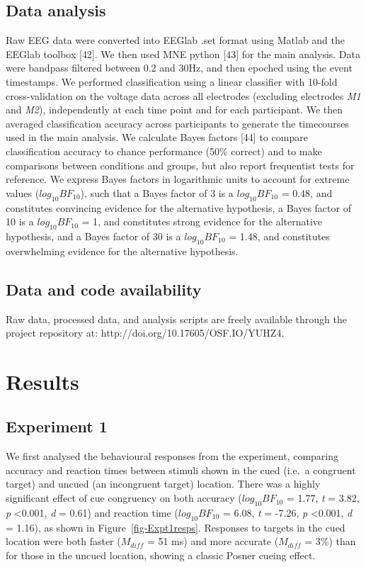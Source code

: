 \documentclass[
  letterpaper,
  DIV=11,
  numbers=noendperiod]{scrartcl}
\begin{document}
\subsection{Data analysis}\label{data-analysis}

Raw EEG data were converted into EEGlab .set format using Matlab and the
EEGlab toolbox {[}42{]}. We then used MNE python {[}43{]} for the main
analysis. Data were bandpass filtered between 0.2 and 30Hz, and then
epoched using the event timestamps. We performed classification using a
linear classifier with 10-fold cross-validation on the voltage data
across all electrodes (excluding electrodes \emph{M1} and \emph{M2}),
independently at each time point and for each participant. We then
averaged classification accuracy across participants to generate the
timecourses used in the main analysis. We calculate Bayes factors
{[}44{]} to compare classification accuracy to chance performance (50\%
correct) and to make comparisons between conditions and groups, but also
report frequentist tests for reference. We express Bayes factors in
logarithmic units to account for extreme values (\(log_{10}BF_{10}\)),
such that a Bayes factor of 3 is a \(log_{10}BF_{10}\) = 0.48, and
constitutes convincing evidence for the alternative hypothesis, a Bayes
factor of 10 is a \(log_{10}BF_{10}\) = 1, and constitutes strong
evidence for the alternative hypothesis, and a Bayes factor of 30 is a
\(log_{10}BF_{10}\) = 1.48, and constitutes overwhelming evidence for
the alternative hypothesis.

\subsection{Data and code
availability}\label{data-and-code-availability}

Raw data, processed data, and analysis scripts are freely available
through the project repository at: http://doi.org/10.17605/OSF.IO/YUHZ4.

\section{Results}\label{results}

\subsection{Experiment 1}\label{experiment-1}

We first analysed the behavioural responses from the experiment,
comparing accuracy and reaction times between stimuli shown in the cued
(i.e.~a congruent target) and uncued (an incongruent target) location.
There was a highly significant effect of cue congruency on both accuracy
(\(log_{10}BF_{10}\) = 1.77, \emph{t} = 3.82, \emph{p} \textless0.001,
\emph{d} = 0.61) and reaction time (\(log_{10}BF_{10}\) = 6.08, \emph{t}
= -7.26, \emph{p} \textless0.001, \emph{d} = 1.16), as shown in
Figure~\ref{fig-Expt1resps}. Responses to targets in the cued location
were both faster (\(M_{diff}\) = 51 ms) and more accurate (\(M_{diff}\)
= 3\%) than for those in the uncued location, showing a classic Posner
cueing effect.
\end{document}
